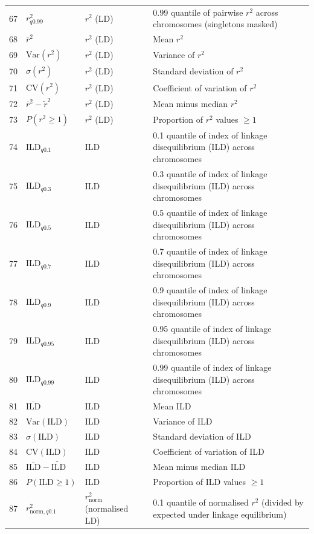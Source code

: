 \begin{longtable}{@{}rllp{7.5cm}@{}}
67 & $r^2_{q0.99}$ & $r^2$ (LD) & 0.99 quantile of pairwise $r^2$ across chromosomes (singletons masked) \\
68 & $\bar{r}^2$ & $r^2$ (LD) & Mean $r^2$ \\
69 & $\mathrm{Var}(r^2)$ & $r^2$ (LD) & Variance of $r^2$ \\
70 & $\sigma(r^2)$ & $r^2$ (LD) & Standard deviation of $r^2$ \\
71 & $\mathrm{CV}(r^2)$ & $r^2$ (LD) & Coefficient of variation of $r^2$ \\
72 & $\bar{r}^2 - \tilde{r}^2$ & $r^2$ (LD) & Mean minus median $r^2$ \\
73 & $P(r^2 \geq 1)$ & $r^2$ (LD) & Proportion of $r^2$ values $\geq 1$ \\
\midrule
74 & ILD$_{q0.1}$ & ILD & 0.1 quantile of index of linkage disequilibrium (ILD) across chromosomes \\
75 & ILD$_{q0.3}$ & ILD & 0.3 quantile of index of linkage disequilibrium (ILD) across chromosomes \\
76 & ILD$_{q0.5}$ & ILD & 0.5 quantile of index of linkage disequilibrium (ILD) across chromosomes \\
77 & ILD$_{q0.7}$ & ILD & 0.7 quantile of index of linkage disequilibrium (ILD) across chromosomes \\
78 & ILD$_{q0.9}$ & ILD & 0.9 quantile of index of linkage disequilibrium (ILD) across chromosomes \\
79 & ILD$_{q0.95}$ & ILD & 0.95 quantile of index of linkage disequilibrium (ILD) across chromosomes \\
80 & ILD$_{q0.99}$ & ILD & 0.99 quantile of index of linkage disequilibrium (ILD) across chromosomes \\
81 & $\overline{\mathrm{ILD}}$ & ILD & Mean ILD \\
82 & $\mathrm{Var}(\mathrm{ILD})$ & ILD & Variance of ILD \\
83 & $\sigma(\mathrm{ILD})$ & ILD & Standard deviation of ILD \\
84 & $\mathrm{CV}(\mathrm{ILD})$ & ILD & Coefficient of variation of ILD \\
85 & $\overline{\mathrm{ILD}} - \widetilde{\mathrm{ILD}}$ & ILD & Mean minus median ILD \\
86 & $P(\mathrm{ILD} \geq 1)$ & ILD & Proportion of ILD values $\geq 1$ \\
\midrule
87 & $r^2_{\mathrm{norm},q0.1}$ & $r^2_\mathrm{norm}$ (normalised LD) & 0.1 quantile of normalised $r^2$ (divided by expected under linkage equilibrium) \\

\end{longtable}
